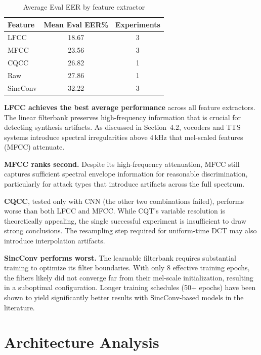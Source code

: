 \documentclass[12pt]{report}
\begin{document}
\begin{table}[h!]
\centering
\caption{Average Eval EER by feature extractor}
\label{tab:feature-avg}
\begin{tabularx}{0.72\textwidth}{lcc}
\toprule
\textbf{Feature} & \textbf{Mean Eval EER\%} & \textbf{Experiments} \\
\midrule
LFCC     & 18.67 & 3 \\
MFCC     & 23.56 & 3 \\
CQCC     & 26.82 & 1 \\
Raw      & 27.86 & 1 \\
SincConv & 32.22 & 3 \\
\bottomrule
\end{tabularx}
\end{table}

\textbf{LFCC achieves the best average performance} across all feature extractors. The linear
filterbank preserves high-frequency information that is crucial for detecting synthesis artifacts.
As discussed in Section~4.2, vocoders and TTS systems introduce spectral irregularities above
4\,kHz that mel-scaled features (MFCC) attenuate.

\textbf{MFCC ranks second.} Despite its high-frequency attenuation, MFCC still captures
sufficient spectral envelope information for reasonable discrimination, particularly for attack
types that introduce artifacts across the full spectrum.

\textbf{CQCC}, tested only with CNN (the other two combinations failed), performs worse than
both LFCC and MFCC. While CQT's variable resolution is theoretically appealing, the single
successful experiment is insufficient to draw strong conclusions. The resampling step required
for uniform-time DCT may also introduce interpolation artifacts.

\textbf{SincConv performs worst.} The learnable filterbank requires substantial training to
optimize its filter boundaries. With only 8 effective training epochs, the filters likely
did not converge far from their mel-scale initialization, resulting in a suboptimal configuration.
Longer training schedules (50+ epochs) have been shown to yield significantly better results
with SincConv-based models in the literature.

\section{Architecture Analysis}
\end{document}

